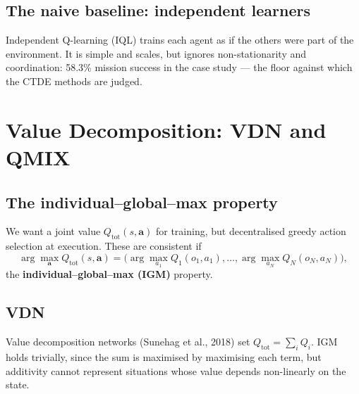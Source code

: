 \documentclass[11pt]{article}
\begin{document}
\subsection{The naive baseline: independent learners}
Independent Q-learning (IQL) trains each agent as if the others were part of the environment. It is simple and scales, but ignores non-stationarity and coordination: 58.3\% mission success in the case study --- the floor against which the CTDE methods are judged.

\section{Value Decomposition: VDN and QMIX}
\subsection{The individual--global--max property}
We want a joint value $Q_{\text{tot}}(s,\mathbf a)$ for training, but decentralised greedy action selection at execution. These are consistent if
\[\arg\max_{\mathbf a}Q_{\text{tot}}(s,\mathbf a)=\Big(\arg\max_{a_1}Q_1(o_1,a_1),\ldots,\arg\max_{a_N}Q_N(o_N,a_N)\Big),\]
the \textbf{individual--global--max (IGM)} property.

\subsection{VDN}
Value decomposition networks (Sunehag et al., 2018) set $Q_{\text{tot}}=\sum_iQ_i$. IGM holds trivially, since the sum is maximised by maximising each term, but additivity cannot represent situations whose value depends non-linearly on the state.
\end{document}
